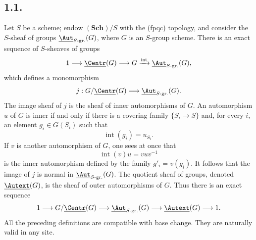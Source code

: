 \subsection*{1.1.}
Let \(S\) be a scheme; endow \((\mathbf{Sch})/S\) with the
\textup{(fpqc)} topology, and consider the \(S\)-sheaf of groups
\(\underline{\Aut}_{S\text{-}\mathrm{gr.}}(G)\), where \(G\) is an
\(S\)-group scheme. There is an exact sequence of \(S\)-sheaves of
groups
\[
  1\longrightarrow \underline{\Centr}(G)
  \longrightarrow G
  \xrightarrow{\mathrm{int}}
  \underline{\Aut}_{S\text{-}\mathrm{gr.}}(G),
\]
which defines a monomorphism
\[
  j:G/\underline{\Centr}(G)
  \longrightarrow \underline{\Aut}_{S\text{-}\mathrm{gr.}}(G).
\]
The image sheaf of \(j\) is the sheaf of inner automorphisms of \(G\).
An automorphism \(u\) of \(G\) is inner if and only if there is a
covering family \(\{S_i\to S\}\) and, for every \(i\), an element
\(g_i\in G(S_i)\) such that
\[
  \operatorname{int}(g_i)=u_{S_i}.
\]
If \(v\) is another automorphism of \(G\), one sees at
once that
\[
  \operatorname{int}(v)u=vuv^{-1}
\]
is the inner automorphism defined by the family
\(g'_i=v(g_i)\). It follows that the image of \(j\) is normal in
\(\underline{\Aut}_{S\text{-}\mathrm{gr.}}(G)\). The quotient sheaf of
groups, denoted \(\underline{\Autext}(G)\), is the sheaf of outer
automorphisms of \(G\). Thus there is an exact sequence
\[
  1\longrightarrow G/\underline{\Centr}(G)
  \longrightarrow \underline{\Aut}_{S\text{-}\mathrm{gr.}}(G)
  \longrightarrow \underline{\Autext}(G)
  \longrightarrow 1.
\]
All the preceding definitions are compatible with base change. They
are naturally valid in any site.

